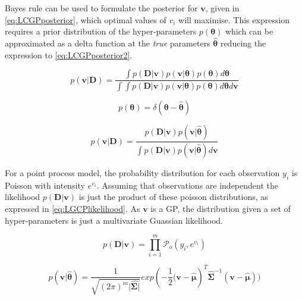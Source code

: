 \documentclass[a4paper,11pt]{report}
\begin{document}
Bayes rule can be used to formulate the posterior for \(\mathbf{v}\), given in \ref{eq:LCGPposterior}, which optimal values of \(v_i\) will maximise. This expression requires a prior distribution of the hyper-parameters \(p(\boldsymbol{\theta})\) which can be approximated as a delta function at the \textit{true} parameters \(\hat{\boldsymbol{\theta}}\) reducing the expression to \ref{eq:LCGPposterior2}.

\singlespacing

\begin{equation} \label{eq:LCGPposterior}
p(\mathbf{v | D}) = \frac{\int{p(\mathbf{D|v})p(\mathbf{v}|\boldsymbol{\theta})p(\boldsymbol{\theta}) d\boldsymbol{\theta}}}{\int{\int{p(\mathbf{D|v})p(\mathbf{v}|\boldsymbol{\theta})p(\boldsymbol{\theta}) d\boldsymbol{\theta} d\mathbf{v}}}}
\end{equation}

\begin{equation}
p(\boldsymbol{\theta}) = \delta(\boldsymbol{\theta} - \hat{\boldsymbol{\theta}})
\end{equation}

\begin{equation} \label{eq:LCGPposterior2}
p(\mathbf{v | D}) = \frac{p(\mathbf{D|v})p(\mathbf{v}|\hat{\boldsymbol{\theta}}) }{\int{p(\mathbf{D|v})p(\mathbf{v}|\hat{\boldsymbol{\theta}}) d\mathbf{v}}}
\end{equation}

\doublespacing

For a point process model, the probability distribution for each observation \(y_i\) is Poisson with intensity \(e^{v_i}\). Assuming that observations are independent the likelihood \(p(\mathbf{D|v})\) is just the product of these poisson distributions, as expressed in \ref{eq:LGCPlikelihood}. As \(\mathbf{v}\) is a GP, the distribution given a set of hyper-parameters is just a multivariate Guassian likelihood. 

\singlespacing

\begin{equation} \label{eq:LGCPlikelihood}
p(\mathbf{D|v}) = \prod_{i=1}^{m} \mathcal{P}_o (y_i, e^{v_i})
\end{equation}

\begin{equation}
p(\mathbf{v}|\hat{\boldsymbol{\theta}}) = \frac{1}{\sqrt{(2\pi)^{m} |\hat{\boldsymbol{\Sigma|}}}} exp(- \frac{1}{2} \mathbf{(v}-\hat{\boldsymbol{\mu}})^{T}\hat{\boldsymbol{\Sigma}}^{-1}(\mathbf{v}-\hat{\boldsymbol{\mu}}))
\end{equation}
\end{document}
